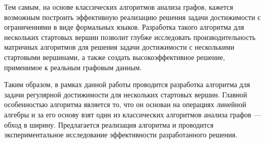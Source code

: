 Тем самым, на основе классических алгоритмов анализа графов, кажется возможным построить эффективную реализацию решения задачи достижимости с ограничениями в виде формальных языков. Разработка такого алгоритма для нескольких стартовых вершин позволит глубже исследовать производительность матричных алгоритмов для решения задачи достижимости с несколькими стартовыми вершинами, а также создать высокоэффективное решение, применимое к реальным графовым данным.

Таким образом, в рамках данной работы проводится разработка алгоритма для задачи регулярной достижимости для нескольких стартовых вершин. Главной особенностью алгоритма является то, что он основан на операциях линейной алгебры и за его основу взят один из классических алгоритмов анализа графов --- обход в ширину. Предлагается реализация алгоритма и проводится экспериментальное исследование эффективности разработанного решения.
